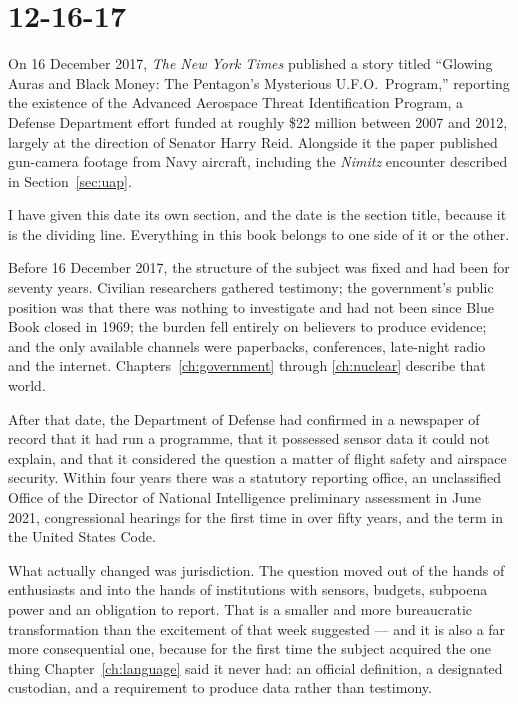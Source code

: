 \section{12-16-17}\label{sec:121617}

On 16 December 2017, \emph{The New York Times} published a story titled ``Glowing Auras and Black
Money: The Pentagon's Mysterious U.F.O.\ Program,'' reporting the existence of the Advanced Aerospace
Threat Identification Program, a Defense Department effort funded at roughly \$22 million between 2007
and 2012, largely at the direction of Senator Harry Reid. Alongside it the paper published gun-camera
footage from Navy aircraft, including the \emph{Nimitz} encounter described in Section~\ref{sec:uap}.


I have given this date its own section, and the date is the section title, because it is the dividing
line. Everything in this book belongs to one side of it or the other.

Before 16 December 2017, the structure of the subject was fixed and had been for seventy years. Civilian
researchers gathered testimony; the government's public position was that there was nothing to
investigate and had not been since Blue Book closed in 1969; the burden fell entirely on believers to
produce evidence; and the only available channels were paperbacks, conferences, late-night radio and
the internet. Chapters~\ref{ch:government} through \ref{ch:nuclear} describe that world.

After that date, the Department of Defense had confirmed in a newspaper of record that it had run a
programme, that it possessed sensor data it could not explain, and that it considered the question a
matter of flight safety and airspace security. Within four years there was a statutory reporting
office, an unclassified Office of the Director of National Intelligence preliminary assessment in June
2021, congressional hearings for the first time in over fifty years, and the term  in the
United States Code.

What actually changed was jurisdiction. The question moved out of the hands of enthusiasts and into the
hands of institutions with sensors, budgets, subpoena power and an obligation to report. That is a
smaller and more bureaucratic transformation than the excitement of that week suggested --- and it is
also a far more consequential one, because for the first time the subject acquired the one thing
Chapter~\ref{ch:language} said it never had: an official definition, a designated custodian, and a
requirement to produce data rather than testimony.

